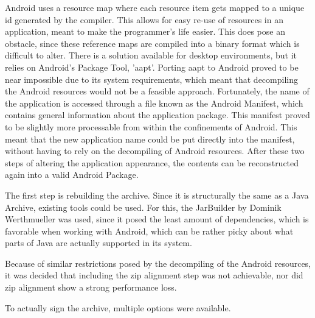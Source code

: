 Android uses a resource map where each resource item gets mapped to a unique id generated by the compiler. 
This allows for easy re-use of resources in an application, meant to make the programmer's life easier.
This does pose an obstacle, since these reference maps are compiled into a binary format which is difficult to alter.
There is a solution available for desktop environments, but it relies on Android's Package Tool, 'aapt'. \cite{website:apktool}
Porting aapt to Android proved to be near impossible due to its system requirements, which meant that decompiling the Android resources would not be a feasible approach.
Fortunately, the name of the application is accessed through a file known as the Android Manifest, which contains general information about the application package.
This manifest proved to be slightly more processable from within the confinements of Android.
This meant that the new application name could be put directly into the manifest, without having to rely on the decompiling of Android resources.
After these two steps of altering the application appearance, the contents can be reconstructed again into a valid Android Package.

The first step is rebuilding the archive. 
Since it is structurally the same as a Java Archive, existing tools could be used. 
For this, the JarBuilder by Dominik Werthmueller was used, since it posed the least amount of dependencies, which is favorable when working with Android, which can be rather picky about what parts of Java are actually supported in its system. \cite{website:jarbuilder}

Because of similar restrictions posed by the decompiling of the Android resources, it was decided that including the zip alignment step was not achievable, nor did zip alignment show a strong performance loss.

To actually sign the archive, multiple options were available. 


